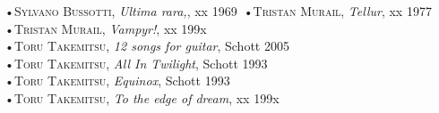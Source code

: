\documentclass[oneside]{article}
\begin{document}
\begin{multicols*}{2}
•\textsc{\textsf {Sylvano Bussotti}}, \emph{Ultima rara,}, xx 1969\
•\textsc{\textsf {Tristan Murail}}, \emph{Tellur}, xx 1977\\
•\textsc{\textsf {Tristan Murail}}, \emph{Vampyr!}, xx 199x\\
•\textsc{\textsf {Toru Takemitsu}}, \emph{12 songs for guitar}, Schott 2005\\
•\textsc{\textsf {Toru Takemitsu}}, \emph{All In Twilight}, Schott 1993\\
•\textsc{\textsf {Toru Takemitsu}}, \emph{Equinox}, Schott 1993\\
•\textsc{\textsf {Toru Takemitsu}}, \emph{To the edge of dream}, xx 199x\\


\end{multicols*}
\end{document}
